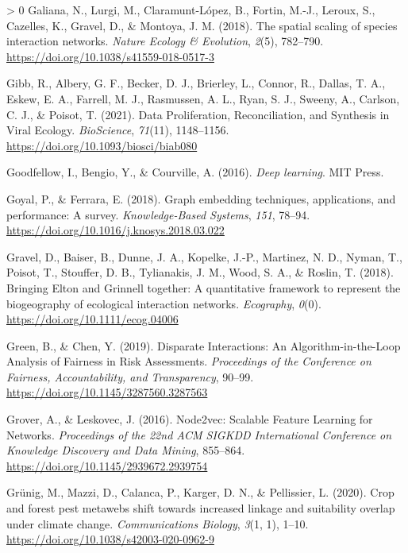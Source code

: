 \documentclass[10pt,oneside]{article}
\newlength{\cslhangindent}
\newenvironment{CSLReferences}[3] %
 {%
  \setlength{\parindent}{0pt}
  \ifodd #1 \everypar{\setlength{\hangindent}{\cslhangindent}}\ignorespaces\fi
  \ifnum #2 > 0
  \setlength{\parskip}{#2\baselineskip}
  \fi
 }%
 {}
\begin{document}
\begin{CSLReferences}{1}{0}
\leavevmode\hypertarget{ref-Galiana2018SpaSca}{}%
Galiana, N., Lurgi, M., Claramunt-López, B., Fortin, M.-J., Leroux, S.,
Cazelles, K., Gravel, D., \& Montoya, J. M. (2018). The spatial scaling
of species interaction networks. \emph{Nature Ecology \& Evolution},
\emph{2}(5), 782--790. \url{https://doi.org/10.1038/s41559-018-0517-3}

\leavevmode\hypertarget{ref-Gibb2021DatPro}{}%
Gibb, R., Albery, G. F., Becker, D. J., Brierley, L., Connor, R.,
Dallas, T. A., Eskew, E. A., Farrell, M. J., Rasmussen, A. L., Ryan, S.
J., Sweeny, A., Carlson, C. J., \& Poisot, T. (2021). Data
Proliferation, Reconciliation, and Synthesis in Viral Ecology.
\emph{BioScience}, \emph{71}(11), 1148--1156.
\url{https://doi.org/10.1093/biosci/biab080}

\leavevmode\hypertarget{ref-Goodfellow2016DeeLea}{}%
Goodfellow, I., Bengio, Y., \& Courville, A. (2016). \emph{Deep
learning}. MIT Press.

\leavevmode\hypertarget{ref-Goyal2018GraEmb}{}%
Goyal, P., \& Ferrara, E. (2018). Graph embedding techniques,
applications, and performance: A survey. \emph{Knowledge-Based Systems},
\emph{151}, 78--94. \url{https://doi.org/10.1016/j.knosys.2018.03.022}

\leavevmode\hypertarget{ref-Gravel2018BriElt}{}%
Gravel, D., Baiser, B., Dunne, J. A., Kopelke, J.-P., Martinez, N. D.,
Nyman, T., Poisot, T., Stouffer, D. B., Tylianakis, J. M., Wood, S. A.,
\& Roslin, T. (2018). Bringing Elton and Grinnell together: A
quantitative framework to represent the biogeography of ecological
interaction networks. \emph{Ecography}, \emph{0}(0).
\url{https://doi.org/10.1111/ecog.04006}

\leavevmode\hypertarget{ref-Green2019DisInt}{}%
Green, B., \& Chen, Y. (2019). Disparate Interactions: An
Algorithm-in-the-Loop Analysis of Fairness in Risk Assessments.
\emph{Proceedings of the Conference on Fairness, Accountability, and
Transparency}, 90--99. \url{https://doi.org/10.1145/3287560.3287563}

\leavevmode\hypertarget{ref-Grover2016NodSca}{}%
Grover, A., \& Leskovec, J. (2016). Node2vec: Scalable Feature Learning
for Networks. \emph{Proceedings of the 22nd ACM SIGKDD International
Conference on Knowledge Discovery and Data Mining}, 855--864.
\url{https://doi.org/10.1145/2939672.2939754}

\leavevmode\hypertarget{ref-Grunig2020CroFor}{}%
Grünig, M., Mazzi, D., Calanca, P., Karger, D. N., \& Pellissier, L.
(2020). Crop and forest pest metawebs shift towards increased linkage
and suitability overlap under climate change. \emph{Communications
Biology}, \emph{3}(1, 1), 1--10.
\url{https://doi.org/10.1038/s42003-020-0962-9}


\end{CSLReferences}
\end{document}
